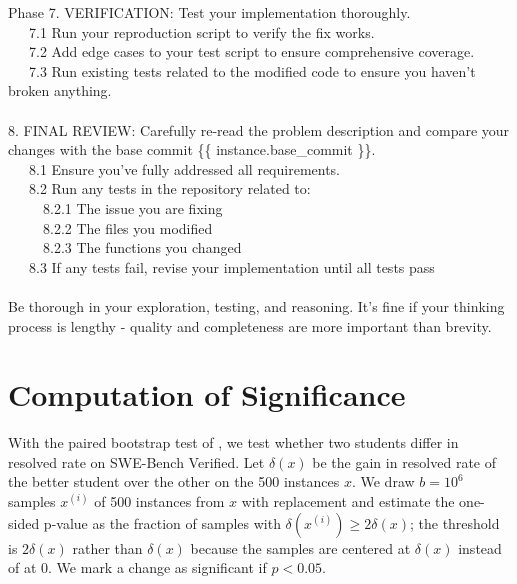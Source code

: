 \begin{tcolorbox}[colback=gray!5!white,colframe=gray!75!black,title=Issue-Solving Prompt,fontupper={\scriptsize\ttfamily\rightskip=0pt plus 1fil},breakable]
Phase 7. VERIFICATION: Test your implementation thoroughly.\\
~~~7.1 Run your reproduction script to verify the fix works.\\
~~~7.2 Add edge cases to your test script to ensure comprehensive coverage.\\
~~~7.3 Run existing tests related to the modified code to ensure you haven't broken anything.\\
\\
8. FINAL REVIEW: Carefully re-read the problem description and compare your changes with the base commit \{\{ instance.base\_commit \}\}.\\
~~~8.1 Ensure you've fully addressed all requirements.\\
~~~8.2 Run any tests in the repository related to:\\
~~~~~8.2.1 The issue you are fixing\\
~~~~~8.2.2 The files you modified\\
~~~~~8.2.3 The functions you changed\\
~~~8.3 If any tests fail, revise your implementation until all tests pass\\
\\
Be thorough in your exploration, testing, and reasoning. It's fine if your thinking process is lengthy - quality and completeness are more important than brevity.
\end{tcolorbox}
\label{catradar:fig:prompt-issue}



\clearpage

\section{Computation of Significance}
With the paired bootstrap test of \citet{berg-kirkpatrick-etal-2012-empirical}, we test whether two students differ in resolved rate on SWE-Bench Verified.
Let $\delta(x)$ be the gain in resolved rate of the better student over the other on the 500 instances $x$.
We draw $b=10^6$ samples $x^{(i)}$ of 500 instances from $x$ with replacement and estimate the one-sided p-value as the fraction of samples with $\delta(x^{(i)}) \geq 2\delta(x)$; the threshold is $2\delta(x)$ rather than $\delta(x)$ because the samples are centered at $\delta(x)$ instead of at 0.
We mark a change as significant if $p<0.05$.


